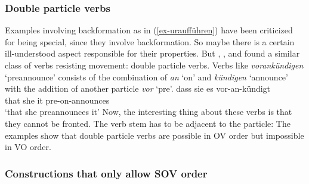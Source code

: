 \subsubsection{Double particle verbs}

Examples involving backformation as in (\ref{ex-uraufführen}) have been criticized for being special, since they involve
backformation. So maybe there is a certain ill-understood aspect responsible for their properties. But
\citet[]{Haider93a},
\citet[]{Vikner2001a}, \citet{Fortmann2007a} and \citet[--60]{Haider2010a} found a similar
class of verbs resisting movement: double particle verbs. Verbs like \emph{vorankündigen} `preannounce'
consists of the combination of \emph{an} `on' and \emph{kündigen} `announce' with the addition of another particle \emph{vor} `pre'.
\ea 
\label{ex-dass-sie-es-vorankündigt}
\gll dass sie es vor-an-kündigt\\
     that she it pre-on-announces\\
\glt `that she preannounces it'
\z
Now, the interesting thing about these verbs is that they cannot be fronted. The verb stem has to be
adjacent to the particle:
\eal
{}
\zl
The examples show that double particle verbs are possible in OV order but impossible in VO order.


\subsubsection{Constructions that only allow SOV order}

